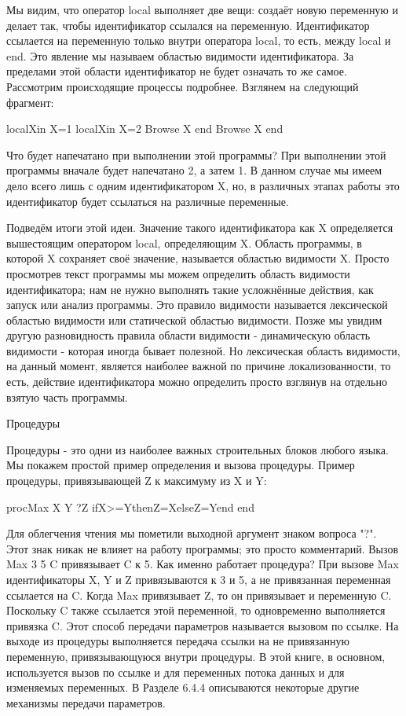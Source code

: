 Мы видим, что оператор local выполняет две вещи: создаёт новую переменную и делает так, чтобы идентификатор ссылался на переменную. Идентификатор ссылается на переменную только внутри оператора local, то есть, между local и end. Это явление мы называем областью видимости идентификатора. За пределами этой области идентификатор не будет означать то же самое. Рассмотрим происходящие процессы подробнее. Взглянем на следующий фрагмент:

localXin
X=1
localXin
X=2
{Browse X}
end
{Browse X}
end

Что будет напечатано при выполнении этой программы? При выполнении этой программы вначале будет напечатано 2, а затем 1. В данном случае мы имеем дело всего лишь с одним идентификатором X, но, в различных этапах работы это идентификатор будет ссылаться на различные переменные.

Подведём итоги этой идеи. Значение такого идентификатора как X определяется вышестоящим оператором local, определяющим X. Область программы, в которой X сохраняет своё значение, называется областью видимости X. Просто просмотрев текст программы мы можем определить область видимости идентификатора; нам не нужно выполнять такие усложнённые действия, как запуск или анализ программы. Это правило видимости называется лексической областью видимости или статической областью видимости. Позже мы увидим другую разновидность правила области видимости - динамическую область видимости - которая иногда бывает полезной. Но лексическая область видимости, на данный момент, является наиболее важной по причине локализованности, то есть, действие идентификатора можно определить просто взглянув на отдельно взятую часть программы.

Процедуры

Процедуры - это одни из наиболее важных строительных блоков любого языка. Мы покажем простой пример определения и вызова процедуры. Пример процедуры, привязывающей Z к максимуму из X и Y:

proc{Max X Y ?Z}
ifX>=YthenZ=XelseZ=Yend
end

Для облегчения чтения мы пометили выходной аргумент знаком вопроса "?". Этот знак никак не влияет на работу программы; это просто комментарий. Вызов {Max 3 5 C} привязывает C к 5. Как именно работает процедура? При вызове Max идентификаторы X, Y и Z привязываются к 3 и 5, а не привязанная переменная ссылается на C. Когда Max привязывает Z, то он привязывает и переменную C. Поскольку C также ссылается этой переменной, то одновременно выполняется привязка C. Этот способ передачи параметров называется вызовом по ссылке. На выходе из процедуры выполняется передача ссылки на не привязанную переменную, привязывающуюся внутри процедуры. В этой книге, в основном, используется вызов по ссылке и для переменных потока данных и для изменяемых переменных. В Разделе 6.4.4 описываются некоторые другие механизмы передачи параметров.

